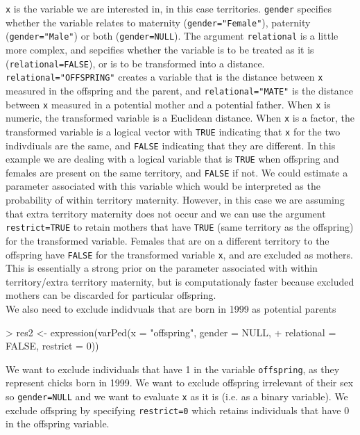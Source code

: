 \documentclass{article}
\begin{document}
\texttt{x} is the variable we are interested in, in this case territories.  \texttt{gender} specifies whether the variable relates to maternity (\texttt{gender="Female"}), paternity (\texttt{gender="Male"}) or both (\texttt{gender=NULL}). The argument \texttt{relational} is a little more complex, and sepcifies whether the variable is to be treated as it is (\texttt{relational=FALSE}), or is to be transformed into a distance.  \texttt{relational="OFFSPRING"} creates a variable that is the distance between \texttt{x} measured in the offspring and the parent, and \texttt{relational="MATE"} is the distance between \texttt{x} measured in a potential mother and a potential father.  When \texttt{x} is numeric, the transformed variable is a Euclidean distance. When \texttt{x} is a factor, the transformed variable is a logical vector with \texttt{TRUE} indicating that \texttt{x} for the two indivdiuals are the same, and \texttt{FALSE} indicating that they are different.  In this example we are dealing with a logical variable that is \texttt{TRUE} when offspring and females are present on the same territory, and \texttt{FALSE} if not. We could estimate a parameter associated with this variable which would be interpreted as the probability of within territory maternity.  However, in this case we are assuming that extra territory maternity does not occur and we can use the argument \texttt{restrict=TRUE} to retain mothers that have \texttt{TRUE} (same territory as the offspring) for the transformed variable. Females that are on a different territory to the offspring have \texttt{FALSE} for the transformed variable \texttt{x}, and are excluded as mothers.  This is essentially a strong prior on the parameter associated with within territory/extra territory maternity, but is computationaly faster because excluded mothers can be discarded for particular offspring.\\

We also need to exclude indidvuals that are born in 1999 as potential parents
 
\begin{Schunk}
\begin{Sinput}
> res2 <- expression(varPed(x = "offspring", gender = NULL, 
+     relational = FALSE, restrict = 0))
\end{Sinput}
\end{Schunk}

We want to exclude individuals that have 1 in the variable \texttt{offspring}, as they represent chicks born in 1999.  We want to exclude offspring irrelevant of their sex so  \texttt{gender=NULL}  and we want to evaluate \texttt{x} as it is (i.e. as a binary variable).  We exclude offspring by specifying \texttt{restrict=0} which retains individuals that have 0 in the offspring variable.\\
\end{document}

